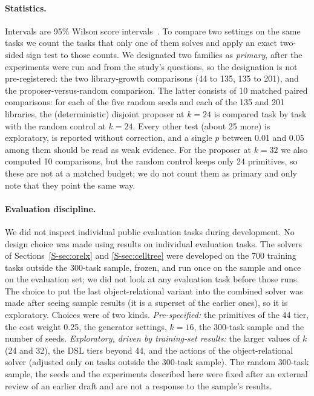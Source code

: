 \documentclass[sigconf,nonacm]{acmart}
\begin{document}
\paragraph{Statistics.} Intervals are 95\% Wilson score intervals~\cite{wilson1927interval}. To compare two settings on the same tasks we count the tasks that only one of them solves and apply an exact two-sided sign test to those counts. We designated two families as \emph{primary}, after the experiments were run and from the study's questions, so the designation is not pre-registered: the two library-growth comparisons (44 to 135, 135 to 201), and the proposer-versus-random comparison. The latter consists of 10 matched paired comparisons: for each of the five random seeds and each of the 135 and 201 libraries, the (deterministic) disjoint proposer at $k=24$ is compared task by task with the random control at $k=24$. Every other test (about 25 more) is exploratory, is reported without correction, and a single $p$ between 0.01 and 0.05 among them should be read as weak evidence. For the proposer at $k=32$ we also computed 10 comparisons, but the random control keeps only 24 primitives, so these are not at a matched budget; we do not count them as primary and only note that they point the same way.
\paragraph{Evaluation discipline.} We did not inspect individual public evaluation tasks during development. No design choice was made using results on individual evaluation tasks. The solvers of Sections~\ref{S-sec:orelx} and \ref{S-sec:celltree} were developed on the 700 training tasks outside the 300-task sample, frozen, and run once on the sample and once on the evaluation set; we did not look at any evaluation task before those runs. The choice to put the last object-relational variant into the combined solver was made after seeing sample results (it is a superset of the earlier ones), so it is exploratory. Choices were of two kinds. \emph{Pre-specified:} the primitives of the 44 tier, the cost weight 0.25, the generator settings, $k=16$, the 300-task sample and the number of seeds. \emph{Exploratory, driven by training-set results:} the larger values of $k$ (24 and 32), the DSL tiers beyond 44, and the actions of the object-relational solver (adjusted only on tasks outside the 300-task sample). The random 300-task sample, the seeds and the experiments described here were fixed after an external review of an earlier draft and are not a response to the sample's results.
\end{document}
